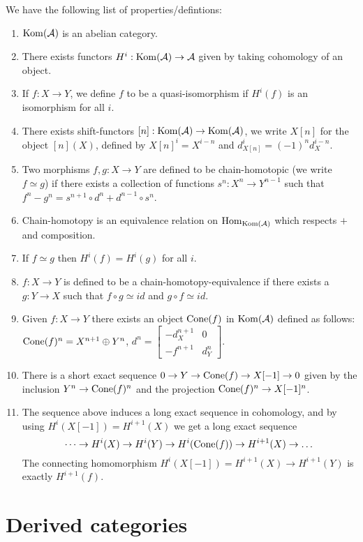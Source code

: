 \documentclass[a4paper, UKenglish]{report}
\begin{document}
We have the following list of properties/defintions:
\begin{enumerate}
\item $\operatorname{Kom}(\mathcal{A})$ is an abelian category.
\item There exists functors $H^i: \operatorname{Kom}(\mathcal{A}) \to \mathcal{A}$ given by taking cohomology of an object.
\item If $f:X \to Y$, we define $f$ to be a quasi-isomorphism if $H^i(f)$ is an isomorphism for all $i$.
\item There exists shift-functors $[n]: \operatorname{Kom}(\mathcal{A}) \to \operatorname{Kom}(\mathcal{A})$, we write $X[n]$ for the object $[n](X)$, defined by $X[n]^i=X^{i-n}$ and $d_{X[n]}^i = (-1)^n d_X^{i-n}$.
\item Two morphisms $f,g: X \to Y$ are defined to be chain-homotopic (we write $f \simeq g$) if there exists a collection of functions $s^n:X^n \to Y^{n-1}$ such that $f^n-g^n=s^{n+1} \circ d^n + d^{n-1} \circ s^n$.
\item Chain-homotopy is an equivalence relation on $\operatorname{Hom}_{\operatorname{Kom}(\mathcal{A})}$ which respects $+$ and composition.
\item If $f \simeq g$ then $H^i(f)=H^i(g)$ for all $i$.
\item $f:X \to Y$ is defined to be a chain-homotopy-equivalence if there exists a $g: Y \to X$ such that $f \circ g \simeq id$ and $g \circ f \simeq id$.
\item Given $f: X \to Y$ there exists an object $\operatorname{Cone}(f)$ in $\operatorname{Kom}(\mathcal{A})$ defined as follows: $\operatorname{Cone}(f)^n = X^{n+1} \oplus Y^n$, $d^n = \begin{bmatrix} -d_X^{n+1} & 0 \\ -f^{n+1} & d_Y^n \end{bmatrix}$.
\item There is a short exact sequence $0 \to Y \to \operatorname{Cone}(f) \to X[-1] \to 0$ given by the inclusion $Y^n \to \operatorname{Cone}(f)^n$ and the projection $\operatorname{Cone}(f)^n \to X[-1]^n$.
\item The sequence above induces a long exact sequence in cohomology, and by using $H^i(X[-1])=H^{i+1}(X)$ we get a long exact sequence
\[ \cdots \to H^i(X) \to H^i(Y) \to H^i(\operatorname{Cone}(f)) \to H^{i+1}(X) \to \dots \]
The connecting homomorphism $H^i(X[-1])=H^{i+1}(X) \to H^{i+1}(Y)$ is exactly $H^{i+1}(f)$.
\end{enumerate}

\section{Derived categories}
\end{document}
